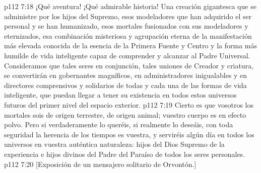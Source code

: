 \vs p112 7:18 ¡Qué aventura! ¡Qué admirable historia! Una creación gigantesca que se administre por los hijos del Supremo, esos modeladores que han adquirido el ser personal y se han humanizado, esos mortales fusionados con sus modeladores y eternizados, esa combinación misteriosa y agrupación eterna de la manifestación más elevada conocida de la esencia de la Primera Fuente y Centro y la forma más humilde de vida inteligente capaz de comprender y alcanzar al Padre Universal. Consideramos que tales seres en conjunción, tales uniones de Creador y criatura, se convertirán en gobernantes magníficos, en administradores inigualables y en directores comprensivos y solidarios de todas y cada una de las formas de vida inteligente, que puedan llegar a tener su existencia en todos estos universos futuros del primer nivel del espacio exterior.
\vs p112 7:19 \pc Cierto es que vosotros los mortales sois de origen terrestre, de origen animal; vuestro cuerpo es en efecto polvo. Pero si verdaderamente lo queréis, si realmente lo deseáis, con toda seguridad la herencia de los tiempos es vuestra, y serviréis algún día en todos los universos en vuestra auténtica naturaleza: hijos del Dios Supremo de la experiencia e hijos divinos del Padre del Paraíso de todos los seres personales.
\vsetoff
\vs p112 7:20 [Exposición de un mensajero solitario de Orvontón.]
